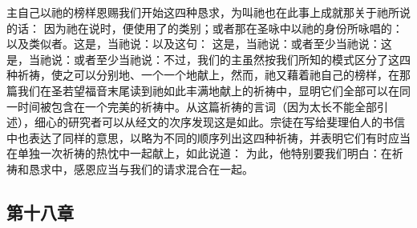 \par

主自己以祂的榜样恩赐我们开始这四种恳求，为叫祂也在此事上成就那关于祂所说的话： 因为祂在说时，便使用了的类别；或者那在圣咏中以祂的身份所咏唱的：以及类似者。这是，当祂说：以及这句： 这是，当祂说：或者至少当祂说：这是，当祂说：或者至少当祂说：不过，我们的主虽然按我们所知的模式区分了这四种祈祷，使之可以分别地、一个一个地献上，然而，祂又藉着祂自己的榜样，在那篇我们在圣若望福音末尾读到祂如此丰满地献上的祈祷中，显明它们全部可以在同一时间被包含在一个完美的祈祷中。从这篇祈祷的言词（因为太长不能全部引述），细心的研究者可以从经文的次序发现这是如此。宗徒在写给斐理伯人的书信中也表达了同样的意思，以略为不同的顺序列出这四种祈祷，并表明它们有时应当在单独一次祈祷的热忱中一起献上，如此说道： 为此，他特别要我们明白：在祈祷和恳求中，感恩应当与我们的请求混合在一起。\par


\subsection{第十八章}

\par

